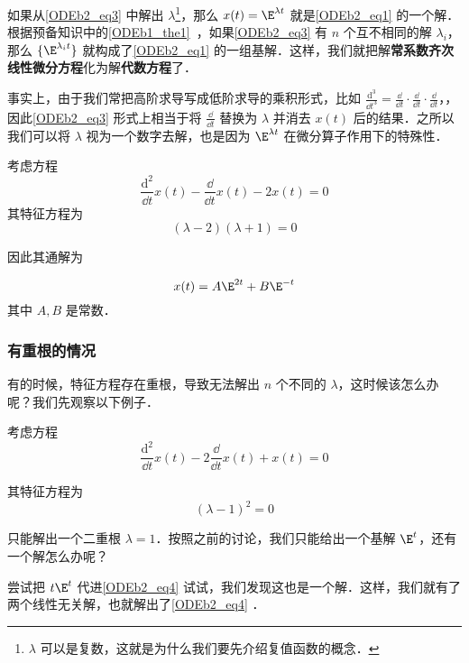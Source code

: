 如果从\autoref{ODEb2_eq3} 中解出 $\lambda$\footnote{$\lambda$ 可以是复数，这就是为什么我们要先介绍复值函数的概念．}，那么 $x(t)=\E^{\lambda t}$ 就是\autoref{ODEb2_eq1} 的一个解．根据预备知识中的\autoref{ODEb1_the1}~，如果\autoref{ODEb2_eq3} 有 $n$ 个互不相同的解 $\lambda_i$，那么 $\{\E^{\lambda_i t}\}$ 就构成了\autoref{ODEb2_eq1} 的一组基解．这样，我们就把解\textbf{常系数齐次线性微分方程}化为解\textbf{代数方程}了．


事实上，由于我们常把高阶求导写成低阶求导的乘积形式，比如 $\frac{\mathrm{d}^3}{\dd t^3}=\frac{\dd }{\dd t}\cdot\frac{\dd }{\dd t}\cdot\frac{\dd }{\dd t}$，，因此\autoref{ODEb2_eq3} 形式上相当于将 $\frac{\dd }{\dd t}$ 替换为 $\lambda$ 并消去 $x(t)$ 后的结果．之所以我们可以将 $\lambda$ 视为一个数字去解，也是因为 $\E^{\lambda t}$ 在微分算子作用下的特殊性．


\begin{example}{}
考虑方程
\begin{equation}
\frac{\mathrm{d}^2}{\dd t}x(t)-\frac{\dd }{\dd t}x(t)-2x(t)=0
\end{equation}
其特征方程为
\begin{equation}
(\lambda-2)(\lambda+1)=0
\end{equation}

因此其通解为

\begin{equation}
x(t)=A\E^{2t}+B\E^{-t}
\end{equation}
其中 $A, B$ 是常数．




\end{example}






\subsubsection{有重根的情况}



有的时候，特征方程存在重根，导致无法解出 $n$ 个不同的 $\lambda$，这时候该怎么办呢？我们先观察以下例子．

\begin{example}{}\label{ODEb2_ex1}
考虑方程
\begin{equation}\label{ODEb2_eq4}
\frac{\mathrm{d}^2}{\dd t}x(t)-2\frac{\dd }{\dd t}x(t)+x(t)=0
\end{equation}

其特征方程为
\begin{equation}
(\lambda-1)^2=0
\end{equation}

只能解出一个二重根 $\lambda=1$．按照之前的讨论，我们只能给出一个基解 $\E^{t}$，还有一个解怎么办呢？

尝试把 $t\E^{t}$ 代进\autoref{ODEb2_eq4} 试试，我们发现这也是一个解．这样，我们就有了两个线性无关解，也就解出了\autoref{ODEb2_eq4} ．




\end{example}




